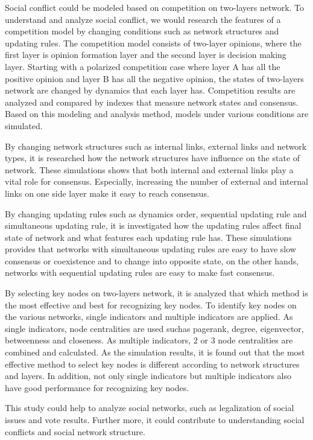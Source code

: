 

\begin{englishabstract}
Social conflict could be modeled based on competition on two-layers network. To understand and analyze social conflict, we would research the features of a competition model by changing conditions such as network structures and updating rules. The competition model consists of two-layer opinions, where the first layer is opinion formation layer and the second layer is decision making layer. Starting with a polarized competition case where layer A has all the positive opinion and layer B has all the negative opinion, the states of two-layers network are changed by dynamics that each layer has. Competition results are analyzed and compared by indexes that measure network states and consensus. Based on this modeling and analysis method, models under various conditions are simulated.  

By changing network structures such as internal links, external links and network types, it is researched how the network structures have influence on the state of network. These simulations shows that both internal and external links play a vital role for consensus. Especially, increasing the number of external and internal links on one side layer make it easy to reach consensus.

By changing updating rules such as dynamics order, sequential updating rule and simultaneous updating rule, it is investigated how the updating rules affect final state of network and what features each updating rule has. These simulations provides that networks with simultaneous updating rules are easy to have slow consensus or coexistence and to change into opposite state, on the other hands, networks with sequential updating rules are easy to make fast consensus.

By selecting key nodes on two-layers network, it is analyzed that which method is the most effective and best for recognizing key nodes. To identify key nodes on the various networks, single indicators and multiple indicators are applied. As single indicators, node centralities are used suchas pagerank, degree, eigenvector, betweenness and closeness. As multiple indicators, $2$ or $3$ node centralities are combined and calculated. As the simulation results, it is found out that the most effective method to select key nodes is different according to network structures and layers. In addition, not only single indicators but multiple indicators also have good performance for recognizing key nodes.

This study could help to analyze social networks, such as legalization of social issues and vote results. Further more, it could contribute to understanding social conflicts and social network structure.\\ \\
\end{englishabstract}

